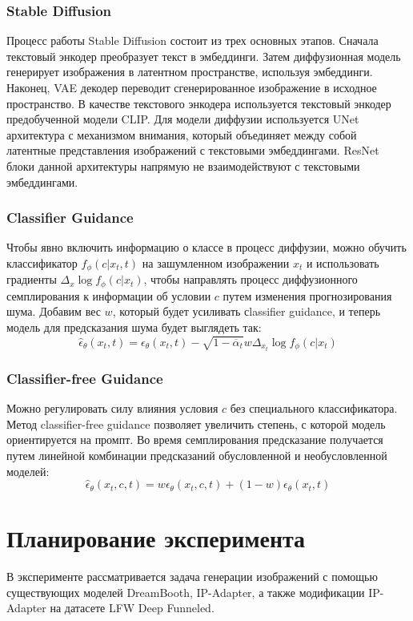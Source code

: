 \documentclass{article}
\begin{document}
\subsubsection{Stable Diffusion}
Процесс работы Stable Diffusion состоит из трех основных этапов. Сначала текстовый энкодер преобразует текст в эмбеддинги. Затем диффузионная модель генерирует изображения в латентном пространстве, используя эмбеддинги. Наконец, VAE декодер переводит сгенерированное изображение в исходное пространство. В качестве текстового энкодера используется текстовый энкодер предобученной модели CLIP. Для модели диффузии используется UNet архитектура с механизмом внимания, который объединяет между собой латентные представления изображений с текстовыми эмбеддингами. ResNet блоки данной архитектуры напрямую не взаимодействуют с текстовыми эмбеддингами. 

\subsubsection{Classifier Guidance}
Чтобы явно включить информацию о классе в процесс диффузии, можно обучить классификатор $f_\phi(c|x_t, t)$ на зашумленном изображении $x_t$ и использовать градиенты $\Delta_x \log f_\phi(c|x_t)$, чтобы направлять процесс диффузионного семплирования к информации об условии $c$ путем изменения прогнозирования шума. Добавим вес $w$, который будет усиливать сlassifier guidance, и теперь модель для предсказания шума будет выглядеть так: $$\hat{\epsilon}_\theta(x_t, t) = \epsilon_\theta(x_t, t) - \sqrt{1 - \overline{\alpha}_t} w \Delta_{x_{t}}\log f_\phi(c|x_t)$$

\subsubsection{Classifier-free Guidance}
Можно регулировать силу влияния условия $c$ без специального классификатора. Метод classifier-free guidance позволяет увеличить степень, с которой модель ориентируется на промпт. Во время семплирования предсказание получается путем линейной комбинации предсказаний обусловленной и необусловленной моделей: $$\hat{\epsilon}_{\theta}(x_t, c, t) = w\epsilon_{\theta}(x_t, c, t) + (1-w)\epsilon_{\theta}(x_t, t)$$

\section{Планирование эксперимента}
В эксперименте рассматривается задача генерации изображений с помощью существующих моделей DreamBooth, IP-Adapter, а также модификации IP-Adapter на датасете LFW Deep Funneled.\cite{5}
\end{document}
